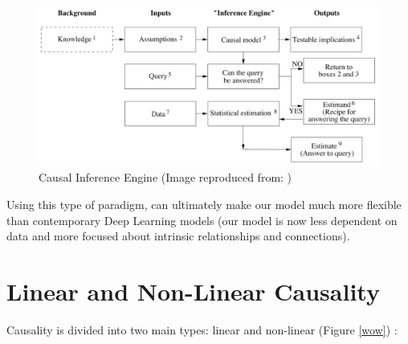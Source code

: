 \begin{figure}[ht!]%
    \centering
    \includegraphics[width=0.8\linewidth]{latex/images/engine.pdf}
    \vspace{-0.2cm}
    \caption{Causal Inference Engine (Image reproduced from: \cite{why})}
    \label{engine}
\end{figure}
\vspace{-0.5cm}

Using this type of paradigm, can ultimately make our model much more flexible than contemporary Deep Learning models (our model is now less dependent on data and more focused about intrinsic relationships and connections).

\section{Linear and Non-Linear Causality}
\vspace{-0.1cm}
Causality is divided into two main types: linear and non-linear (Figure \ref{wow})
\cite{system}: 

